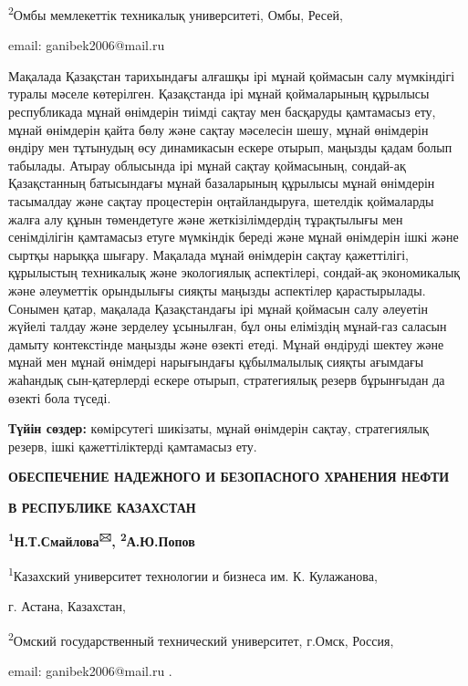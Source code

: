 \textsuperscript{2}Омбы мемлекеттік техникалық университеті, Омбы,
Ресей,

email: ganibek2006@mail.ru

Мақалада Қазақстан тарихындағы алғашқы ірі мұнай қоймасын салу
мүмкіндігі туралы мәселе көтерілген. Қазақстанда ірі мұнай қоймаларының
құрылысы республикада мұнай өнімдерін тиімді сақтау мен басқаруды
қамтамасыз ету, мұнай өнімдерін қайта бөлу және сақтау мәселесін шешу,
мұнай өнімдерін өндіру мен тұтынудың өсу динамикасын ескере отырып,
маңызды қадам болып табылады. Атырау облысында ірі мұнай сақтау
қоймасының, сондай-ақ Қазақстанның батысындағы мұнай базаларының
құрылысы мұнай өнімдерін тасымалдау және сақтау процестерін
оңтайландыруға, шетелдік қоймаларды жалға алу құнын төмендетуге және
жеткізілімдердің тұрақтылығы мен сенімділігін қамтамасыз етуге мүмкіндік
береді және мұнай өнімдерін ішкі және сыртқы нарыққа шығару. Мақалада
мұнай өнімдерін сақтау қажеттілігі, құрылыстың техникалық және
экологиялық аспектілері, сондай-ақ экономикалық және әлеуметтік
орындылығы сияқты маңызды аспектілер қарастырылады. Сонымен қатар,
мақалада Қазақстандағы ірі мұнай қоймасын салу әлеуетін жүйелі талдау
және зерделеу ұсынылған, бұл оны еліміздің мұнай-газ саласын дамыту
контекстінде маңызды және өзекті етеді. Мұнай өндіруді шектеу және мұнай
мен мұнай өнімдері нарығындағы құбылмалылық сияқты ағымдағы жаһандық
сын-қатерлерді ескере отырып, стратегиялық резерв бұрынғыдан да өзекті
бола түседі.

{\bfseries Түйін сөздер:} көмірсутегі шикізаты, мұнай өнімдерін сақтау,
стратегиялық резерв, ішкі қажеттіліктерді қамтамасыз ету.

{\bfseries ОБЕСПЕЧЕНИЕ НАДЕЖНОГО И БЕЗОПАСНОГО ХРАНЕНИЯ НЕФТИ}

{\bfseries В РЕСПУБЛИКЕ КАЗАХСТАН}

{\bfseries \textsuperscript{1}Н.Т.Смайлова\textsuperscript{🖂},
\textsuperscript{2}А.Ю.Попов}

\textsuperscript{1}Казахский университет технологии и бизнеса им. К.
Кулажанова,

г. Астана, Казахстан,

\textsuperscript{2}Омский государственный технический университет,
г.Омск, Россия,

email: ganibek2006@mail.ru .

